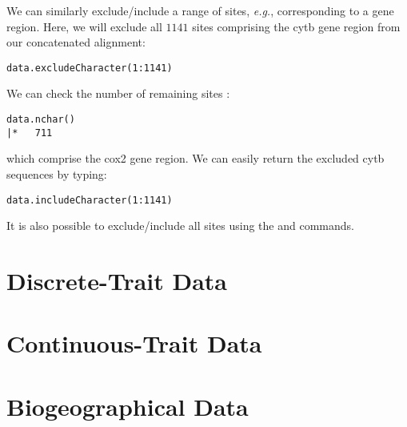 
We can similarly exclude/include a range of sites, {\it e.g.}, corresponding to a gene region.
Here, we will exclude all $1141$ sites comprising the cytb gene region from our concatenated alignment:
{\tt \begin{snugshade*}
\begin{lstlisting}
data.excludeCharacter(1:1141)
\end{lstlisting}
\end{snugshade*}}

We can check the number of remaining sites :
{\tt \begin{snugshade*}
\begin{lstlisting}
data.nchar()
|*   711
\end{lstlisting}
\end{snugshade*}}
which comprise the cox2 gene region. 
We can easily return the excluded cytb sequences by typing:

{\tt \begin{snugshade*}
\begin{lstlisting}
data.includeCharacter(1:1141)
\end{lstlisting}
\end{snugshade*}}

It is also possible to exclude/include all sites using the  and  commands.



\section{Discrete-Trait Data}



\section{Continuous-Trait Data}


\section{Biogeographical Data}

